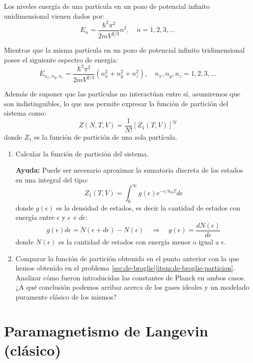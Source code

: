 \documentclass[a4paper,11pt]{article}
\begin{document}
Los niveles energía de una partícula en un pozo de potencial infinito 
unidimensional vienen dados por:
$$ E_n = \frac{\hbar^2 \pi^2}{2m V^{2/3}} n^2, \quad n=1, 2, 3, \dots $$

\noindent Mientras que la misma partícula en un pozo de potencial infinito 
tridimensional posee el siguiente espectro de energía:
$$ E_{n_x, n_y, n_z} = \frac{\hbar^2 \pi^2}{2m V^{2/3}} (n_x^2 + n_y^2 + n_z^2),
\quad n_x, n_y, n_z = 1, 2, 3, \dots $$


Además de suponer que las partículas no interactúan entre sí, 
asumiremos que son indistinguibles, lo que nos permite expresar la 
función de partición del sistema como:
$$ Z(N,T,V) = \frac{1}{N!} [Z_1(T, V)]^N $$
donde $Z_1$ es la función de partición de una sola partícula.


\begin{enumerate}[label=(\alph*),
                  leftmargin=2\parindent,
                  rightmargin=2\parindent]

    \item{Calcular la función de partición del sistema.}
    
    {\small
    \textbf{Ayuda:} Puede ser necesario aproximar la sumatoria 
    discreta de los estados en una integral del tipo:
    $$ Z_1(T, V) =
    \int_0^\infty g(\epsilon) e^{-\epsilon/k_B T} d\epsilon $$
    donde $g(\epsilon)$ es la densidad de estados, es decir la cantidad de 
    estados con energía entre $\epsilon$ y $\epsilon + d\epsilon$:
    $$ g(\epsilon) d\epsilon = N(\epsilon + d\epsilon) - N(\epsilon)
    \quad \Rightarrow \quad g(\epsilon) = \frac{d N(\epsilon)}{d\epsilon} $$
    donde $N(\epsilon)$ es la cantidad de estados con energía menor o 
    igual a $\epsilon$.
    }

    \item{Comparar la función de partición obtenida en el punto 
          anterior con la que hemos obtenido en el problema 
          \ref{sec:de-broglie}\ref{item:de-broglie-particion}.
          Analizar cómo fueron introducidas las constantes de Planck 
          en ambos casos. ¿A qué conclusión podemos arribar acerca 
          de los gases ideales y un modelado puramente clásico de los 
          mismos?
          }

\end{enumerate}


\section{Paramagnetismo de Langevin (clásico)}
\label{sec:paramagnetismo-langevin}
\end{document}

